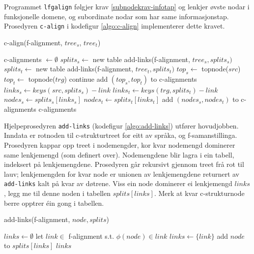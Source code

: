 \documentclass[11pt,a4paper,oneside,draft]{book}
\begin{document}
Programmet \texttt{lfgalign} følgjer krav \ref{subnodekrav-infotap} og
lenkjer øvste nodar i funksjonelle domene, og subordinate nodar som
har same informasjonstap. Prosedyren \texttt{c-align} i kodefigur
\ref{algo:c-align} implementerer dette kravet. 

   \begin{algorithm}[]
     \caption{c-align(f-alignment, $tree_s$, $tree_t$)}
     \label{algo:c-align}
      
     c-alignments $\gets \emptyset$ \;
     $splits_s \gets$ new table \;
     add-links(f-alignment, $tree_s, splits_s)$  \;
     $splits_t \gets$ new table \;
     add-links(f-alignment, $tree_t, splits_t)$  \;
      {
       $top_s \gets$ topnode($src$) \;
       $top_t \gets$ topnode($trg$) \;
        { continue\; }
       add $(top_s,top_t)$ to c-alignments \;
        {
          {
           $links_s \gets keys(src, splits_s) - link$ \;
           $links_t \gets keys(trg, splits_t) - link$ \;
           $nodes_s \gets splits_s[links_s]$ \;
           $nodes_t \gets splits_t[links_t]$ \;
            {
             add $(nodes_s,nodes_t)$ to c-alignments \;
           }
         }
        }
      }
      \Return c-alignments \;
      \end{algorithm}    

Hjelpeprosedyren \texttt{add-links} (kodefigur \ref{algo:add-links}) utfører
hovudjobben. Inndata er rotnoden til c-strukturtreet for eitt av
språka, og f-samanstillinga. Prosedyren kappar opp treet i
nodemengder, kor kvar nodemengd dominerer same lenkjemengd (som
definert over).  Nodemengdene blir lagra i ein tabell, indeksert på
lenkjemengdene. Prosedyren går rekursivt gjennom treet frå rot til
lauv; lenkjemengden for kvar node er unionen av lenkjemengdene
returnert av \texttt{add-links} kalt på kvar av døtrene. Viss ein node
dominerer ei lenkjemengd $links$, legg me til denne noden i tabellen
$splits[links]$. Merk at kvar c-strukturnode berre opptrer éin gong i
tabellen.

   \begin{algorithm}[]
   \caption{add-links(f-alignment, $node, splits$)}
   \label{algo:add-links}
      
        $links \gets \emptyset$\;
    {
        {
          let $link \in$ f-alignment s.t. $\phi(node) \in link$ \;
           {$links \gets \{link\}$}
        }
        add $node$ to $splits[links]$ \;
       }
        \Return $links$ \;
  \end{algorithm}
\end{document}

